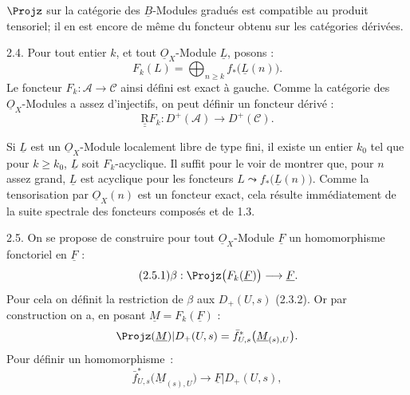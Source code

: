 
\(\Projz\) sur la catégorie des \(\underline{B}\)-Modules gradués est compatible au produit tensoriel; il en est encore de même du foncteur obtenu sur les catégories dérivées.


2.4. Pour tout entier $k$, et tout $\underline{O}_X$-Module $\underline{L}$, posons :
\begin{equation}\tag{2.4.1}
  F_k(L)=\bigoplus_{n\geq k} f_*\bigl(\underline{L}(n)\bigr).
\end{equation}
Le foncteur $F_k:\mathcal A\to\mathcal C$ ainsi défini est exact à gauche. Comme la catégorie des $\underline{O}_X$-Modules a assez d'injectifs, on peut définir un foncteur dérivé :
\begin{equation}\tag{2.4.2}
  \underline{\underline{\mathrm R}} F_k:D^+(\mathcal A)\longrightarrow D^+(\mathcal C).
\end{equation}

Si $\underline{L}$ est un $\underline{O}_X$-Module localement libre de type fini, il existe un entier $k_0$ tel que pour $k\geq k_0$, $\underline{L}$ soit $F_k$-acyclique. Il suffit pour le voir de montrer que, pour $n$ assez grand, $\underline{L}$ est acyclique pour les foncteurs $L\leadsto f_*\bigl(\underline{L}(n)\bigr)$. Comme la tensorisation par $\underline{O}_X(n)$ est un foncteur exact, cela résulte immédiatement de la suite spectrale des foncteurs composés et de 1.3.

2.5. On se propose de construire pour tout $\underline{O}_X$-Module $\underline{F}$ un homomorphisme fonctoriel en $\underline{F}$ :
\begin{equation}\tag{2.5.1}
  \beta:\Projz\bigl(F_k(\underline{F})\bigr)\longrightarrow \underline{F}.
\end{equation}
Pour cela on définit la restriction de $\beta$ aux $D_+(U,s)$ (2.3.2). Or par construction on a, en posant $\underline{M}=F_k(\underline{F})$ :
\[
  \Projz(\underline{M})|D_+(U,s)
  =\bar f^{*}_{U,s}\bigl(\underline{M}_{(s),U}\bigr).
\]
Pour définir un homomorphisme~:
\[
  \bar f^{*}_{U,s}\bigl(\underline{M}_{(s),U}\bigr)\longrightarrow \underline{F}|D_+(U,s),
\]
